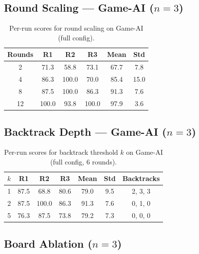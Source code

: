\documentclass{article}
\begin{document}
\subsection{Round Scaling --- Game-AI ($n{=}3$)}

\begin{table}[h]
\centering
\caption{Per-run scores for round scaling on Game-AI (full config).}
\label{tab:rounds_runs}
\small
\begin{tabular}{@{}cccc|cc@{}}
\toprule
\textbf{Rounds} & \textbf{R1} & \textbf{R2} & \textbf{R3} & \textbf{Mean} & \textbf{Std} \\
\midrule
2  & 71.3  & 58.8  & 73.1  & 67.7  & 7.8  \\
4  & 86.3  & 100.0 & 70.0  & 85.4  & 15.0 \\
8  & 87.5  & 100.0 & 86.3  & 91.3  & 7.6  \\
12 & 100.0 & 93.8  & 100.0 & 97.9  & 3.6  \\
\bottomrule
\end{tabular}
\end{table}

\subsection{Backtrack Depth --- Game-AI ($n{=}3$)}

\begin{table}[h]
\centering
\caption{Per-run scores for backtrack threshold $k$ on Game-AI (full config, 6 rounds).}
\label{tab:depth_runs}
\small
\begin{tabular}{@{}cccc|ccc@{}}
\toprule
$k$ & \textbf{R1} & \textbf{R2} & \textbf{R3} & \textbf{Mean} & \textbf{Std} & \textbf{Backtracks} \\
\midrule
1 & 87.5  & 68.8  & 80.6  & 79.0  & 9.5  & 2, 3, 3 \\
2 & 87.5  & 100.0 & 86.3  & 91.3  & 7.6  & 0, 1, 0 \\
5 & 76.3  & 87.5  & 73.8  & 79.2  & 7.3  & 0, 0, 0 \\
\bottomrule
\end{tabular}
\end{table}

\subsection{Board Ablation ($n{=}3$)}
\end{document}
